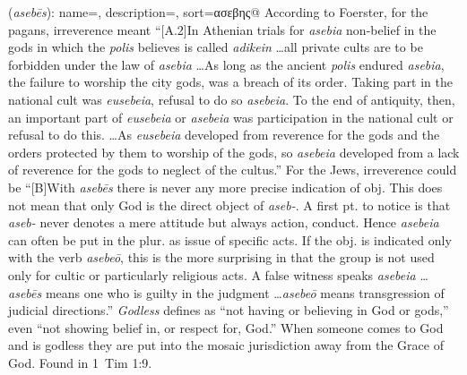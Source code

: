 \item[Godless,]

(\textit{asebēs}):
{
    name=,
    description={},
    sort=ασεβης@
}
According to Foerster, for the pagans, irreverence meant ``[A.2]In Athenian trials for \emph{asebia} non-belief in the gods in which the \emph{polis} believes is called \emph{adikein} \ldots all private cults are to be forbidden under the law of \emph{asebia} \ldots As long as the ancient \emph{polis} endured \emph{asebia}, the failure to worship the city gods, was a breach of its order. Taking part in the national cult was \emph{eusebeia}, refusal to do so \emph{asebeia}. To the end of antiquity, then, an important part of \emph{eusebeia} or \emph{asebeia} was participation in the national cult or refusal to do this. \ldots As \emph{eusebeia} developed from reverence for the gods and the orders protected by them to worship of the gods, so \emph{asebeia} developed from a lack of reverence for the gods  to neglect of the cultus.''
For the Jews, irreverence could be ``[B]With \emph{asebēs} there is never any more precise indication of obj. This does not mean that only God is the direct object of \emph{aseb-}. A first pt. to notice is that \emph{aseb-} never denotes a mere attitude but always action, conduct. Hence \emph{asebeia} can often be put in the plur. as issue of specific acts. If the obj. is indicated only with the verb \emph{asebeō}, this is the more surprising in that the group is not used only for cultic or particularly religious acts. A false witness speaks \emph{asebeia} \ldots \emph{asebēs} means one who is guilty in the judgment \ldots \emph{asebeō} means transgression of judicial directions.''
\emph{Godless} defines as ``not having or believing in God or gods,'' even ``not showing belief in, or respect for, God.'' When someone comes to God and is godless they are put into the mosaic jurisdiction away from the Grace of God.
Found in 1~Tim 1:9.
